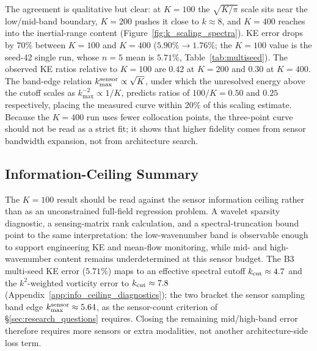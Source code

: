 The agreement is qualitative but clear: at $K=100$ the $\sqrt{K/\pi}$ scale sits near the low/mid-band boundary, $K=200$ pushes it close to $k\approx 8$, and $K=400$ reaches into the inertial-range content (Figure~\ref{fig:k_scaling_spectra}). KE error drops by $70\%$ between $K=100$ and $K=400$ ($5.90\%\to1.76\%$; the $K=100$ value is the seed-42 single run, whose $n=5$ mean is $5.71\%$, Table~\ref{tab:multiseed}). The observed KE ratios relative to $K=100$ are $0.42$ at $K=200$ and $0.30$ at $K=400$. The band-edge relation $k_{\max}^{\rm sensor}\propto\sqrt{K}$, under which the unresolved energy above the cutoff scales as $k_{\max}^{-2}\propto 1/K$, predicts ratios of $100/K = 0.50$ and $0.25$ respectively, placing the measured curve within $20\%$ of this scaling estimate. Because the $K=400$ run uses fewer collocation points, the three-point curve should not be read as a strict fit; it shows that higher fidelity comes from sensor bandwidth expansion, not from architecture search.


\subsection{Information-Ceiling Summary}
\label{sec:info_limit_summary}

The $K=100$ result should be read against the sensor information ceiling rather than as an unconstrained full-field regression problem. A wavelet sparsity diagnostic, a sensing-matrix rank calculation, and a spectral-truncation bound point to the same interpretation: the low-wavenumber band is observable enough to support engineering KE and mean-flow monitoring, while mid- and high-wavenumber content remains underdetermined at this sensor budget. The B3 multi-seed KE error ($5.71\%$) maps to an effective spectral cutoff $k_{\rm cut}\approx 4.7$ and the $k^2$-weighted vorticity error to $k_{\rm cut}\approx 7.8$ (Appendix~\ref{app:info_ceiling_diagnostics}); the two bracket the sensor sampling band edge $k_{\max}^{\rm sensor}\approx 5.64$, as the sensor-count criterion of \S\ref{sec:research_questions} requires. Closing the remaining mid/high-band error therefore requires more sensors or extra modalities, not another architecture-side loss term.


